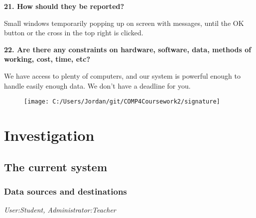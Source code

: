 \textbf{21. How should they be reported?}

Small windows temporarily popping up on screen with messages, until the OK button or the cross in the top right is clicked.

\textbf{22. Are there any constraints on hardware, software, data, methods of working, cost, time, etc?}

We have access to plenty of computers, and our system is powerful enough to handle easily enough data. We don't have a deadline for you. 

\begin{figure}[H]
    \texttt{[image: C:/Users/Jordan/git/COMP4Coursework2/signature]}
\end{figure}

\section{Investigation}

\subsection{The current system}

\subsubsection{Data sources and destinations}

\textit{User:Student, Administrator:Teacher}

